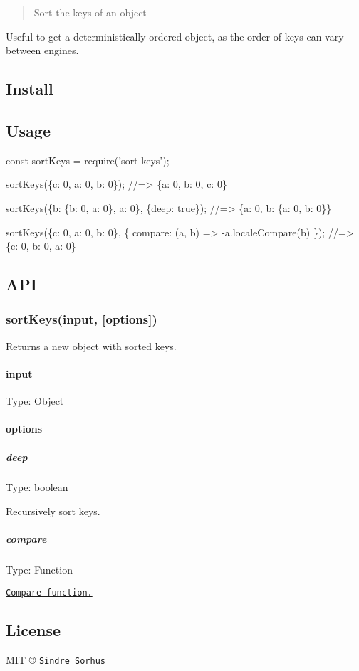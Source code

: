 \begin{quote}
Sort the keys of an object \end{quote}


Useful to get a deterministically ordered object, as the order of keys can vary between engines.

\subsection*{Install}




\subsection*{Usage}


\begin{DoxyCode}
const sortKeys = require('sort-keys');

sortKeys(\{c: 0, a: 0, b: 0\});
//=> \{a: 0, b: 0, c: 0\}

sortKeys(\{b: \{b: 0, a: 0\}, a: 0\}, \{deep: true\});
//=> \{a: 0, b: \{a: 0, b: 0\}\}

sortKeys(\{c: 0, a: 0, b: 0\}, \{
    compare: (a, b) => -a.localeCompare(b)
\});
//=> \{c: 0, b: 0, a: 0\}
\end{DoxyCode}


\subsection*{A\+PI}

\subsubsection*{sort\+Keys(input, \mbox{[}options\mbox{]})}

Returns a new object with sorted keys.

\paragraph*{input}

Type\+: {\ttfamily Object}

\paragraph*{options}

\subparagraph*{deep}

Type\+: {\ttfamily boolean}

Recursively sort keys.

\subparagraph*{compare}

Type\+: {\ttfamily Function}

\href{https://developer.mozilla.org/en-US/docs/Web/JavaScript/Reference/Global_Objects/Array/sort}{\tt Compare function.}

\subsection*{License}

M\+IT © \href{https://sindresorhus.com}{\tt Sindre Sorhus} 